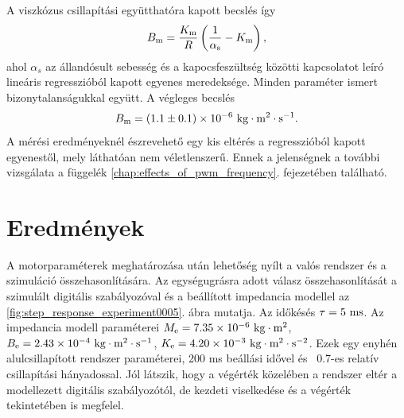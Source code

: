 A viszkózus csillapítási együtthatóra kapott becslés így
\begin{equation}
    B_{\mathrm{m}} = \frac{K_{\mathrm{m}}}{R}\left(\frac{1}{\alpha_{\mathrm{s}}} - K_{\mathrm{m}}\right),
\end{equation}
ahol \(\alpha_s\) az állandósult sebesség és a kapocsfeszültség közötti kapcsolatot 
leíró lineáris regresszióból kapott egyenes meredeksége. Minden paraméter ismert bizonytalanságukkal 
együtt. A végleges becslés
\begin{equation}
    B_{\mathrm{m}} = (1.1 \pm 0.1)\times 10^{-6}~\mathrm{kg\cdot m^2\cdot s^{-1}}.
\end{equation}
A mérési eredményeknél észrevehető egy kis eltérés a regresszióból kapott egyenestől, mely láthatóan nem 
véletlenszerű. Ennek a jelenségnek a további vizsgálata a függelék \ref{chap:effects_of_pwm_frequency}. 
fejezetében található. 

\section{Eredmények}
A motorparaméterek meghatározása után lehetőség nyílt a valós rendszer és a szimuláció összehasonlítására.
Az egységugrásra adott válasz összehasonlítását a szimulált digitális szabályozóval és a beállított impedancia modellel 
az \ref{fig:step_response_experiment0005}. ábra mutatja. Az időkésés \(\tau = 5~\mathrm{ms}\). Az impedancia modell paraméterei 
\(M_{\mathrm{e}} = 7.35 \times 10^{-6}~\mathrm{kg \cdot m^2}\), \(B_{\mathrm{e}} = 2.43 \times 10^{-4}~\mathrm{kg \cdot m^2 \cdot s^{-1}}\),
\(K_{\mathrm{e}} = 4.20 \times 10^{-3}~\mathrm{kg \cdot m^2 \cdot s^{-2}}\). Ezek egy enyhén alulcsillapított rendszer paraméterei, 
200 ms beállási idővel és ~0.7-es relatív csillapítási hányadossal. Jól látszik, hogy a végérték közelében 
a rendszer eltér a modellezett digitális szabályozótól, de kezdeti viselkedése és a végérték tekintetében is megfelel.

